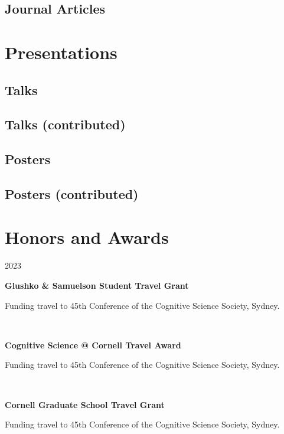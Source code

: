 \documentclass{article}
\newcommand{\awardentry}[3]{
  \begin{minipage}[t]{.15\textwidth}
    \begin{flushright}
      \hfill {#1}
    \end{flushright}
  \end{minipage}
  \hfill\vline\hfill
  \begin{minipage}[t]{.80\textwidth}
    \textbf{#2}

    \footnotesize{#3}
  \end{minipage}\\\vspace{.25cm}
}
\begin{document}
\subsection{Journal Articles}
\nocite{*}
\printbibliography[heading=none]



\section{Presentations}

\subsection{Talks}
\nocite{*}
\printbibliography[heading=none]

\subsection{Talks (contributed)}
\nocite{*}
\printbibliography[heading=none]

\subsection{Posters}
\nocite{*}
\printbibliography[heading=none]

\subsection{Posters (contributed)}
\nocite{*}
\printbibliography[heading=none]


\section{Honors and Awards}

\awardentry{2023}{Glushko \& Samuelson Student Travel Grant}
{Funding travel to 45th Conference of the Cognitive Science Society, Sydney.}

\awardentry{}{Cognitive Science @ Cornell Travel Award}
{Funding travel to 45th Conference of the Cognitive Science Society, Sydney.}

\awardentry{}{Cornell Graduate School Travel Grant}
{Funding travel to 45th Conference of the Cognitive Science Society, Sydney.}
\end{document}

